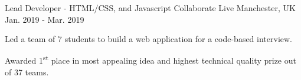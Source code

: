 

\begin{cventries}


  \cventry
    {Lead Developer - HTML/CSS, and Javascript} %
    {Collaborate Live} %
    {Manchester, UK} %
    {Jan. 2019 - Mar. 2019} %
    {
      \begin{cvitems} %
        \item {Led a team of 7 students to build a web application for a code-based interview.}
        \item {Awarded 1\textsuperscript{st} place in most appealing idea and highest technical quality prize out of 37 teams.}
      \end{cvitems}
    }



\end{cventries}
